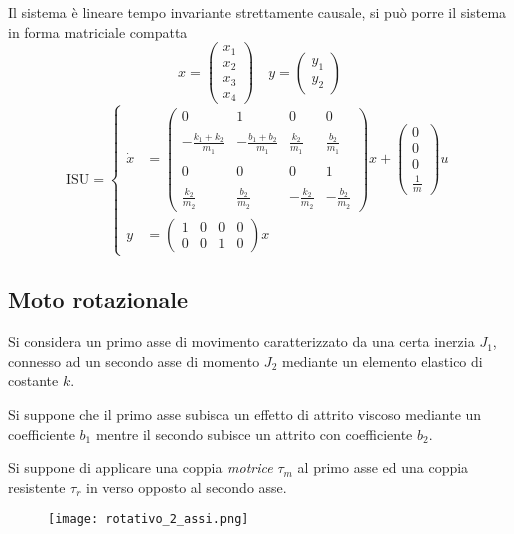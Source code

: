 \newpage
Il sistema è lineare tempo invariante strettamente causale, si può porre il
sistema in forma matriciale compatta
$$x =
\begin{pmatrix}
 x_1 \\ x_2 \\ x_3 \\ x_4
\end{pmatrix} \quad
y= \begin{pmatrix}
    y_1 \\ y_2
   \end{pmatrix}
$$
$$\text{ISU} = \left\{\begin{aligned}
\dot{x} &= \begin{pmatrix}
0 & 1 & 0 & 0 \\
\\
-\frac{k_1+k_2}{m_1} & -\frac{b_1+b_2}{m_1} &
\frac{k_2}{m_1} & \frac{b_2}{m_1}\\
\\
0 & 0 & 0 & 1\\ \\
\frac{k_2}{m_2} & \frac{b_2}{m_2} & -\frac{k_2}{m_2} & -\frac{b_2}{m_2}
          \end{pmatrix}x +
          \begin{pmatrix}
        0 \\ 0 \\ 0 \\ \frac{1}{m}
          \end{pmatrix}u\\
y &=      \begin{pmatrix}
           1 & 0 & 0 & 0 \\
           0 & 0 & 1 & 0
          \end{pmatrix}x
\end{aligned}\right.$$

\subsection{Moto rotazionale}
Si considera un primo asse di movimento caratterizzato da una certa inerzia
$J_1$, connesso ad un secondo asse di momento $J_2$ mediante un elemento
elastico di costante $k$.

Si suppone che il primo asse subisca un effetto di attrito viscoso mediante un
coefficiente $b_1$ mentre il secondo subisce un attrito con coefficiente $b_2$.

Si suppone di applicare una coppia \textit{motrice} $\tau_m$ al primo asse ed
una coppia resistente $\tau_r$ in verso opposto al secondo asse.
\begin{figure}[h]
 \centering
 \texttt{[image: rotativo\_2\_assi.png]}
 \label{Fig.:rotativo_due_assi}
\end{figure}

